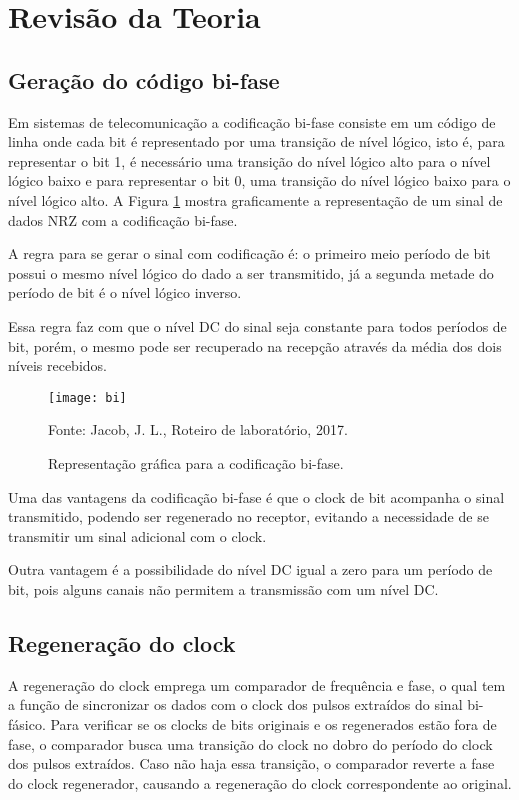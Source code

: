 \newpage
\section{Revisão da Teoria}

\subsection{Geração do código bi-fase}
	Em sistemas de telecomunicação a codificação bi-fase consiste em um código de linha onde cada bit é representado por uma transição de nível lógico, isto é, para representar o bit 1, é necessário uma transição do nível lógico alto para o nível lógico baixo e para representar o bit 0, uma transição do nível lógico baixo para o nível lógico alto. A Figura \ref{fig:bi} mostra graficamente a representação de um sinal de dados NRZ com a codificação bi-fase.
	
	A regra para se gerar o sinal com codificação é: o primeiro meio período de bit possui o mesmo nível lógico do dado a ser transmitido, já a segunda metade do período de bit é o nível lógico inverso.
		
	Essa regra faz com que o nível DC do sinal seja constante para todos períodos de bit, porém, o mesmo pode ser recuperado na recepção através da média dos dois níveis recebidos.
	
	\begin{figure}[H]
		\centering
		\caption{Representação gráfica para a codificação bi-fase.}
		\texttt{[image: bi]}
			
		\small Fonte: Jacob, J. L., Roteiro de laboratório, 2017.
		\label{fig:bi}
	\end{figure}
		
	Uma das vantagens da codificação bi-fase é que o clock de bit acompanha o sinal transmitido, podendo ser regenerado no receptor, evitando a necessidade de se transmitir um sinal adicional com o clock.
	
	Outra vantagem é a possibilidade do nível DC igual a zero para um período de bit, pois alguns canais não permitem a transmissão com um nível DC.
	
	
\subsection{Regeneração do clock}

	A regeneração do clock emprega um comparador de frequência e fase, o qual tem a função de sincronizar os dados com o clock dos pulsos extraídos do sinal bi-fásico. Para verificar se os clocks de bits originais e os regenerados estão fora de fase, o comparador busca uma transição do clock no dobro do período do clock dos pulsos extraídos. Caso não haja essa transição, o comparador reverte a fase do clock regenerador, causando a regeneração do clock correspondente ao original.
	

